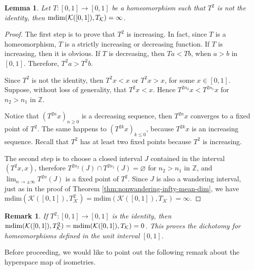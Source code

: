 \documentclass[sn-mathphys-num]{sn-jnl}%
\theoremstyle{thmstyleone}%
\newtheorem{lemma}{Lemma}
\theoremstyle{thmstyletwo}%
\newtheorem{remark}{Remark}%
\theoremstyle{thmstylethree}%
\newcommand*\induce[1]{#1_\mathcal{K}}
\newcommand*\hyp[1]{\mathcal{#1}}
\begin{document}
\begin{lemma}\label{lemma:t-square-not-identity}
    Let $T: [0, 1] \to [0, 1]$ be a homeomorphism such that $T^2$ is not the identity, then $\normalfont{\text{mdim}}(\hyp{K}([0, 1]), \induce{T}) = \infty$.
\end{lemma}
\begin{proof}
    The first step is to prove that $T^2$ is increasing. In fact, since $T$ is a homeomorphism, $T$ is a strictly increasing or decreasing function. If $T$ is increasing, then it is obvious. If $T$ is decreasing, then $Ta < Tb$, when $a > b$ in $[0, 1]$. Therefore, $T^2a > T^2b$. 

    Since $T^2$ is not the identity, then $T^2x < x$ or $T^2x > x$, for some $x \in [0, 1]$. Suppose, without loss of generality, that $T^2x < x$. Hence $T^{2n_2}x < T^{2n_1}x$ for $n_2 > n_1$ in $\mathbb{Z}$.

    Notice that $(T^{2n}x)_{n \geq 0}$ is a decreasing sequence, then $T^{2n}x$ converges to a fixed point of $T^2$. The same happens to $(T^{2k}x)_{k \leq 0}$, because $T^{2k}x$ is an increasing sequence. Recall that $T^2$ has at least two fixed points because $T^2$ is increasing.

    The second step is to choose a closed interval $J$ contained in the interval $(T^2x, x)$, therefore $T^{2n_2}(J) \cap T^{2n_1}(J) = \varnothing$ for $n_2 > n_1$ in $\mathbb{Z}$, and $\lim_{n \to \pm\infty}T^{2n}(J)$ is a fixed point of $T^2$. Since $J$ is also a wandering interval, just as in the proof of Theorem \ref{thm:nonwandering-infty-mean-dim}, we have $\text{mdim}(\hyp{K}([0, 1]), \induce{T}^2) = \text{mdim}(\hyp{K}([0, 1]), \induce{T}) = \infty$.
\end{proof}

\begin{remark}\label{rmrk:dychotomy-mean-dim-unit-interval}
    If $T^2: [0,1] \to [0, 1]$ is the identity, then $\normalfont{\text{mdim}}(\hyp{K}([0, 1]), \induce{T}^2) = \normalfont{\text{mdim}}(\hyp{K}([0, 1]), \induce{T}) = 0$. This proves the dichotomy for homeomorphisms defined in the unit interval $[0, 1]$.\\
\end{remark}

Before proceeding, we would like to point out the following remark about the hyperspace map of isometries.\\
\end{document}
